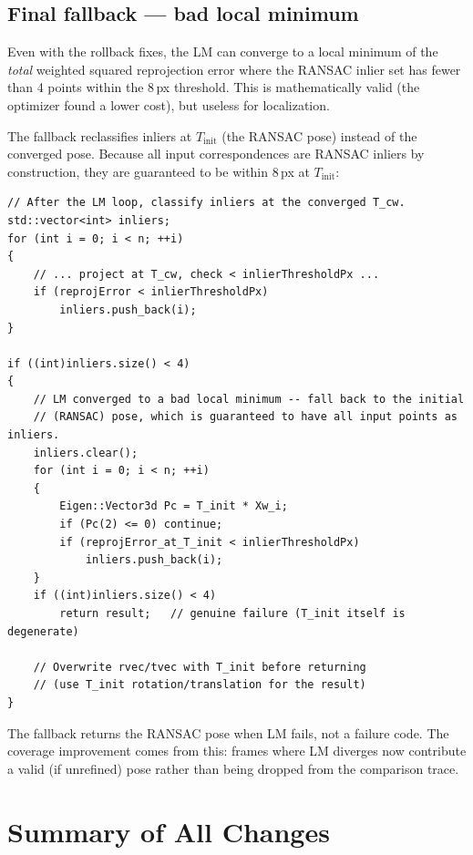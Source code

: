 \documentclass[12pt,a4paper]{article}
\begin{document}
\subsection{Final fallback — bad local minimum}

Even with the rollback fixes, the LM can converge to a local minimum of the
\emph{total} weighted squared reprojection error where the RANSAC inlier set has
fewer than 4 points within the 8\,px threshold. This is mathematically valid (the
optimizer found a lower cost), but useless for localization.

The fallback reclassifies inliers at $T_\text{init}$ (the RANSAC pose) instead of
the converged pose. Because all input correspondences are RANSAC inliers by
construction, they are guaranteed to be within 8\,px at $T_\text{init}$:

\begin{lstlisting}[style=cpp,
  caption={T\_init fallback when LM converges to a bad local minimum ---
           \texttt{solvePnPWeighted()}}]
// After the LM loop, classify inliers at the converged T_cw.
std::vector<int> inliers;
for (int i = 0; i < n; ++i)
{
    // ... project at T_cw, check < inlierThresholdPx ...
    if (reprojError < inlierThresholdPx)
        inliers.push_back(i);
}

if ((int)inliers.size() < 4)
{
    // LM converged to a bad local minimum -- fall back to the initial
    // (RANSAC) pose, which is guaranteed to have all input points as inliers.
    inliers.clear();
    for (int i = 0; i < n; ++i)
    {
        Eigen::Vector3d Pc = T_init * Xw_i;
        if (Pc(2) <= 0) continue;
        if (reprojError_at_T_init < inlierThresholdPx)
            inliers.push_back(i);
    }
    if ((int)inliers.size() < 4)
        return result;   // genuine failure (T_init itself is degenerate)

    // Overwrite rvec/tvec with T_init before returning
    // (use T_init rotation/translation for the result)
}
\end{lstlisting}

\begin{notebox}
The fallback returns the RANSAC pose when LM fails, not a failure code. The
coverage improvement comes from this: frames where LM diverges now contribute a
valid (if unrefined) pose rather than being dropped from the comparison trace.
\end{notebox}

\section{Summary of All Changes}
\end{document}
